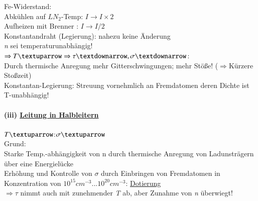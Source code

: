 \documentclass[11pt]{article}
\begin{document}
	Fe-Widerstand:\\
	Abkühlen auf $ LN_2 $-Temp: $ I\longrightarrow I\times2 $\\
	Aufheizen mit Brenner : $  I \longrightarrow I/2 $ \\
	Konstantandraht (Legierung): nahezu keine Änderung \\
	\emph{n} sei temperaturunabhängig!
	$ \Rightarrow T\textuparrow \Rightarrow \tau\textdownarrow,\sigma\textdownarrow $: \\
	Durch thermische Anregung mehr Gitterschwingungen; mehr Stöße! ($ \Rightarrow $Kürzere Stoßzeit) \\
	Konstantan-Legierung: Streuung vornehmlich an Fremdatomen deren Dichte ist T-unabhängig!
	\paragraph{(iii) \underline{Leitung in Halbleitern}} \hfill 
	\break
	\break
	\indent $ T\textuparrow $\hspace{1cm}:\hspace{1cm}$ \sigma \textuparrow $ \\
	Grund:\\
	\indent Starke Temp.-abhängigkeit von n durch thermische Anregung von Ladunsträgern über eine Energielücke \\
	\indent Erhöhung und Kontrolle von $ \sigma $ durch Einbringen von Fremdatomen in Konzentration von $  10 ^{15}cm^{-3}...10^{20}cm^{-3} $: \underline{Dotierung} \\
	$ \Rightarrow \tau $ nimmt auch mit zunehmender \emph{T} ab, aber Zunahme von \emph{n} überwiegt!
\end{document}

